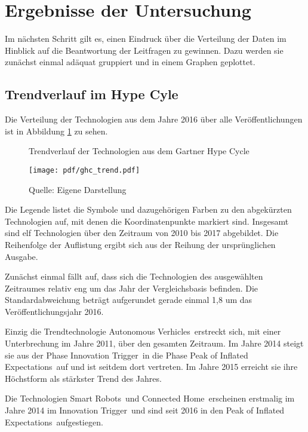 \section{Ergebnisse der Untersuchung}
Im nächsten Schritt gilt es, einen Eindruck über die Verteilung der Daten im Hinblick auf die Beantwortung der Leitfragen zu gewinnen. Dazu werden sie zunächst einmal adäquat gruppiert und in einem Graphen geplottet.

\subsection{Trendverlauf im \glqq Hype Cyle\grqq}
Die Verteilung der Technologien aus dem Jahre 2016 über alle Veröffentlichungen ist in Abbildung \ref{fig:ghc_trend} zu sehen.

\begin{figure}
	\centering
	\caption{Trendverlauf der Technologien aus dem \glqq Gartner Hype Cycle\grqq}
	\texttt{[image: pdf/ghc\_trend.pdf]}
	\caption*{Quelle: Eigene Darstellung}
	\label{fig:ghc_trend}
\end{figure}

Die Legende listet die Symbole und dazugehörigen Farben zu den abgekürzten Technologien auf, mit denen die Koordinatenpunkte markiert sind. Insgesamt sind elf Technologien über den Zeitraum von 2010 bis 2017 abgebildet. Die Reihenfolge der Auflistung ergibt sich aus der Reihung der ursprünglichen Ausgabe.

Zunächst einmal fällt auf, dass sich die Technologien des ausgewählten Zeitraumes relativ eng um das Jahr der Vergleichsbasis befinden. Die Standardabweichung beträgt aufgerundet gerade einmal 1,8 um das Veröffentlichungsjahr 2016.

Einzig die Trendtechnologie \glqq Autonomous Verhicles\grqq~erstreckt sich, mit einer Unterbrechung im Jahre 2011, über den gesamten Zeitraum. Im Jahre 2014 steigt sie aus der Phase \glqq Innovation Trigger\grqq~in die Phase \glqq Peak of Inflated Expectations\grqq~auf und ist seitdem dort vertreten. Im Jahre 2015 erreicht sie ihre Höchstform als stärkster Trend des Jahres.

Die Technologien \glqq Smart Robots\grqq~und \glqq Connected Home\grqq~erscheinen erstmalig im Jahre 2014 im \glqq Innovation Trigger\grqq~und sind seit 2016 in den \glqq Peak of Inflated Expectations\grqq~aufgestiegen.

